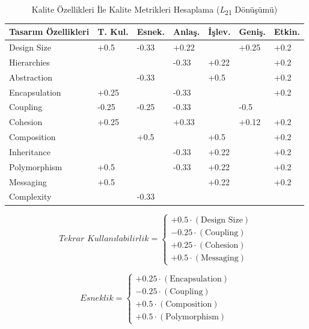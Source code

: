 \documentclass[conference]{IEEEtran}
\begin{document}
\begin{table}[h]
	\centering
	\begin{tabular}{|l|l|l|l|l|l|l|}
		\hline
		Tasarım Özellikleri & T. Kul. & Esnek. & Anlaş. & İşlev. & Geniş. & Etkin. \\ \hline
		Design Size         & +0.5    & -0.33  & +0.22  &        & +0.25  & +0.2   \\ \hline
		Hierarchies         &         &        & -0.33  & +0.22  &        & +0.2   \\ \hline
		Abstraction         &         & -0.33  &        & +0.5   &        & +0.2   \\ \hline
		Encapsulation       & +0.25   &        & -0.33  &        &        & +0.2   \\ \hline
		Coupling            & -0.25   & -0.25  & -0.33  &        & -0.5   &        \\ \hline
		Cohesion            & +0.25   &        & +0.33  &        & +0.12  & +0.2   \\ \hline
		Composition         &         & +0.5   &        & +0.5   &        & +0.2   \\ \hline
		Inheritance         &         &        & -0.33  & +0.22  &        & +0.2   \\ \hline
		Polymorphism        & +0.5    &        & -0.33  & +0.22  &        & +0.2   \\ \hline
		Messaging           & +0.5    &        &        & +0.22  &        & +0.2   \\ \hline
		Complexity          &         & -0.33  &        &        &        &        \\ \hline
	\end{tabular}
	\caption{Kalite Özellikleri İle Kalite Metrikleri
		Hesaplama (\textit{L}\textsubscript{21} Dönüşümü)
	}
\end{table}

\begin{equation}
	\textit{Tekrar Kullanılabilirlik} =
	\begin{cases}
		+0.5 \cdot (\text{Design Size}) \\
		-0.25 \cdot (\text{Coupling}) \\
		+0.25 \cdot (\text{Cohesion}) \\
		+0.5 \cdot (\text{Messaging})
	\end{cases}
	\label{equ:reuse}
\end{equation}

\begin{equation}
	\textit{Esneklik} =
	\begin{cases}
		+0.25 \cdot (\text{Encapsulation}) \\
		-0.25 \cdot (\text{Coupling}) \\
		+0.5 \cdot (\text{Composition}) \\
		+0.5 \cdot (\text{Polymorphism})
	\end{cases}
	\label{equ:flexibility}
\end{equation}
\end{document}
